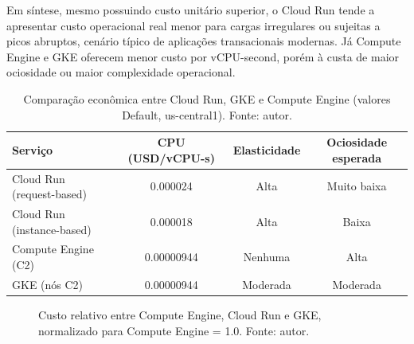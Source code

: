 Em síntese, mesmo possuindo custo unitário superior, o Cloud Run tende a
apresentar custo operacional real menor para cargas irregulares ou sujeitas a
picos abruptos, cenário típico de aplicações transacionais modernas. Já Compute
Engine e GKE oferecem menor custo por vCPU-second, porém à custa de maior
ociosidade ou maior complexidade operacional.

\begin{table}[ht]
\centering
\caption{Comparação econômica entre Cloud Run, GKE e Compute Engine (valores Default, us-central1). Fonte: autor.}
\label{tab:custos_final}
\begin{tabular}{lccc}
\toprule
\textbf{Serviço} & \textbf{CPU (USD/vCPU-s)} & \textbf{Elasticidade} & \textbf{Ociosidade esperada} \\
\midrule
Cloud Run (request-based) & 0.000024 & Alta & Muito baixa \\ Cloud Run
(instance-based) & 0.000018 & Alta & Baixa \\ Compute Engine (C2) & 0.00000944 &
Nenhuma & Alta \\ GKE (nós C2) & 0.00000944 & Moderada & Moderada \\
\bottomrule
\end{tabular}
\end{table}

\begin{figure}[ht]
\centering
{}
\caption{Custo relativo entre Compute Engine, Cloud Run e GKE, normalizado para Compute Engine = 1.0. Fonte: autor.}
\label{fig:custo-relativo}
\end{figure}
